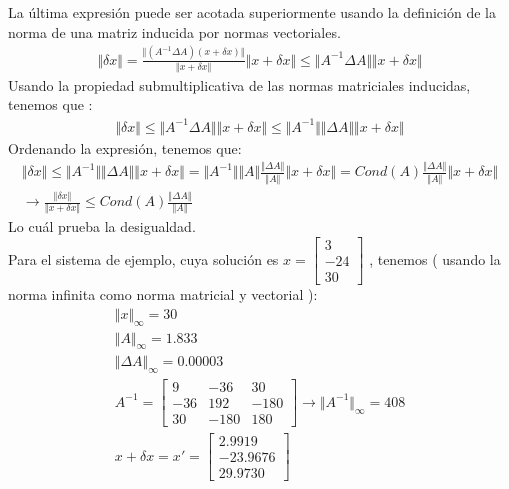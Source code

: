\documentclass{article}
\begin{document}
\begin{enumerate}
La \'ultima expresi\'on puede ser acotada superiormente usando la definici\'on de la norma de una matriz inducida por normas vectoriales.
\begin{gather*}
\Vert \delta x \Vert = 
		\frac{ \Vert ( A^{-1}\Delta A ) ( x + \delta x ) \Vert }{ \Vert x + \delta x \Vert }
			\Vert x + \delta x \Vert \leq
		\Vert A^{-1} \Delta A \Vert \Vert x + \delta x \Vert
\end{gather*}
Usando la propiedad submultiplicativa de las normas matriciales inducidas, tenemos que :
\begin{gather*}
\Vert \delta x \Vert \leq
		\Vert A^{-1} \Delta A \Vert \Vert x + \delta x \Vert \leq 
		\Vert A^{-1} \Vert \Vert \Delta A \Vert \Vert x + \delta x \Vert
\end{gather*}
Ordenando la expresi\'on, tenemos que:
\begin{gather*}
\Vert \delta x \Vert \leq 
		\Vert A^{-1} \Vert \Vert \Delta A \Vert \Vert x + \delta x \Vert =
		\Vert A^{-1} \Vert \Vert A \Vert \frac{ \Vert \Delta A \Vert }{ \Vert A \Vert } \Vert x + \delta x \Vert = Cond(A) \frac{ \Vert \Delta A \Vert }{ \Vert A \Vert } \Vert x + \delta x \Vert\\
\rightarrow
\frac{ \Vert \delta x \Vert }{ \Vert x + \delta x \Vert } \leq Cond(A) \frac{ \Vert \Delta A \Vert }{ \Vert A \Vert }
\end{gather*}
Lo cu\'al prueba la desigualdad.
\\
Para el sistema de ejemplo, cuya soluci\'on es $x = \begin{bmatrix} 3\\-24\\30 \end{bmatrix}$ , tenemos ( usando la norma infinita como norma matricial y vectorial ):
\begin{gather*}
\Vert x \Vert_{\infty} = 30 \\
\Vert A \Vert_{\infty} = 1.833 \\
\Vert \Delta A \Vert_{\infty} = 0.00003 \\
A^{-1} = 
\begin{bmatrix}
	9	&  -36	&	30 \\
   -36	&  192	&  -180 \\
    30	& -180 	& 	180
\end{bmatrix} \rightarrow \Vert A^{-1} \Vert_{\infty} = 408 \\
x + \delta x = x' = \begin{bmatrix} 2.9919\\-23.9676\\29.9730 \end{bmatrix} \\

\end{gather*}
\end{enumerate}
\end{document}
